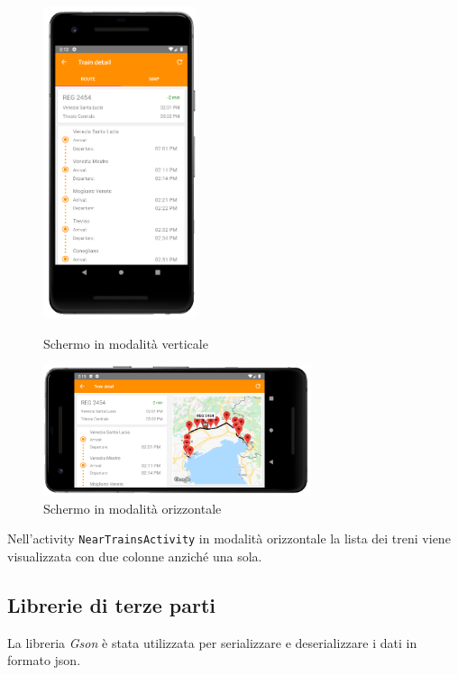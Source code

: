 \documentclass[a4paper,10pt]{article}
\begin{document}
    \begin{figure}[h!]
      \begin{minipage}{0.45\textwidth}
        \centering
        \includegraphics[width=0.4\textwidth]{images/port}
        \captionsetup{justification=centering}
        \caption{Schermo in modalità verticale}
        \label{port}
      \end{minipage}
      \hfill
      \begin{minipage}{0.50\textwidth}
        \centering
        \includegraphics[width=0.7\textwidth]{images/land}
        \captionsetup{justification=centering}
        \caption{Schermo in modalità orizzontale}
        \label{land}
      \end{minipage}
    \end{figure}

    \medskip
    \noindent
    Nell'activity \texttt{NearTrainsActivity} in modalità orizzontale la lista dei treni viene visualizzata con due colonne anziché una sola.

  \subsection{Librerie di terze parti}
    La libreria \emph{Gson} \cite{gson} è stata utilizzata per serializzare e deserializzare i dati in formato json.
\end{document}

